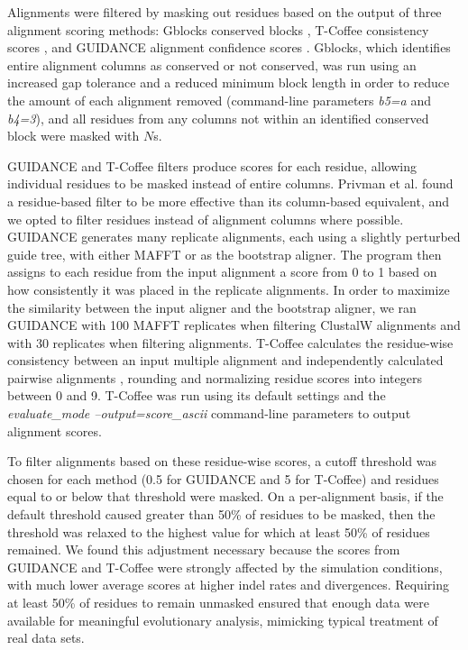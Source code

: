 \documentclass{article}
\begin{document}
Alignments were filtered by masking out residues based on the output
of three alignment scoring methods: Gblocks conserved blocks
\citep{Castresana2000Selection}, T-Coffee consistency scores
\citep{Notredame2000TCoffee,Notredame2003Using}, and GUIDANCE
alignment confidence scores \citep{Penn2010Alignment}. Gblocks, which
identifies entire alignment columns as conserved or not conserved, was
run using an increased gap tolerance and a reduced minimum block
length in order to reduce the amount of each alignment removed
(command-line parameters {\em b5=a} and {\em b4=3}), and all residues
from any columns not within an identified conserved block were masked
with $N$s.

GUIDANCE and T-Coffee filters produce scores for each residue,
allowing individual residues to be masked instead of entire
columns. Privman et al. \citeyearpar{Privman2011Improving} found a
residue-based filter to be more effective than its column-based
equivalent, and we opted to filter residues instead of alignment
columns where possible. GUIDANCE generates many replicate alignments,
each using a slightly perturbed guide tree, with either MAFFT or
\pranka as the bootstrap aligner. The program then assigns to each
residue from the input alignment a score from 0 to 1 based on how
consistently it was placed in the replicate alignments. In order to
maximize the similarity between the input aligner and the bootstrap
aligner, we ran GUIDANCE with 100 MAFFT replicates when filtering
ClustalW alignments and with 30 \pranka replicates when filtering
\prankc alignments. T-Coffee calculates the residue-wise consistency
between an input multiple alignment and independently calculated
pairwise alignments \citep{Notredame2003Using}, rounding and
normalizing residue scores into integers between 0 and 9. T-Coffee was
run using its default settings and the {\em evaluate\_mode
  --output=score\_ascii} command-line parameters to output alignment
scores.

To filter alignments based on these residue-wise scores, a cutoff
threshold was chosen for each method (0.5 for GUIDANCE and 5 for
T-Coffee) and residues equal to or below that threshold were
masked. On a per-alignment basis, if the default threshold caused
greater than 50\% of residues to be masked, then the threshold was
relaxed to the highest value for which at least 50\% of residues
remained. We found this adjustment necessary because the scores from
GUIDANCE and T-Coffee were strongly affected by the simulation
conditions, with much lower average scores at higher indel rates and
divergences. Requiring at least 50\% of residues to remain unmasked
ensured that enough data were available for meaningful evolutionary
analysis, mimicking typical treatment of real data sets.
\end{document}
